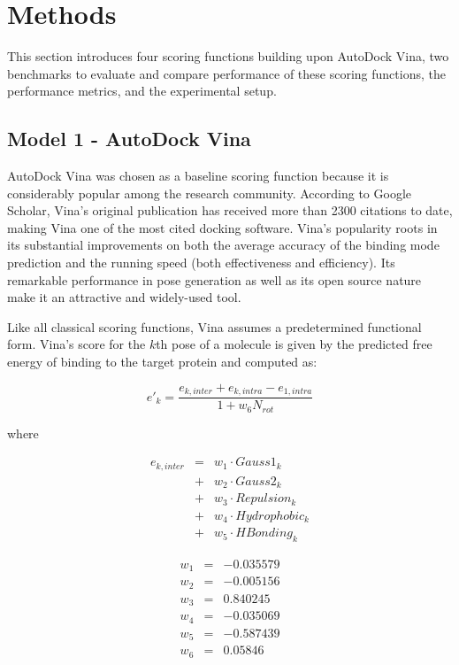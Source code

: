 \documentclass[twocolumn]{bmcart}
\begin{document}
\section*{Methods}

This section introduces four scoring functions building upon AutoDock Vina, two benchmarks to evaluate and compare performance of these scoring functions, the performance metrics, and the experimental setup.

\subsection*{Model 1 - AutoDock Vina}

AutoDock Vina \cite{595} was chosen as a baseline scoring function because it is considerably popular among the research community. According to Google Scholar, Vina's original publication \cite{595} has received more than 2300 citations to date, making Vina one of the most cited docking software. Vina's popularity roots in its substantial improvements on both the average accuracy of the binding mode prediction and the running speed (both effectiveness and efficiency). Its remarkable performance in pose generation as well as its open source nature make it an attractive and widely-used tool.

Like all classical scoring functions, Vina assumes a predetermined functional form. Vina's score for the $k$th pose of a molecule is given by the predicted free energy of binding to the target protein and computed as:

\begin{equation}
\label{rescoring2:e_k}
e'_k=\frac{e_{k,inter}+e_{k,intra}-e_{1,intra}}{1+w_6N_{rot}}
\end{equation}

where

\begin{eqnarray}
\label{rescoring2:e_k_inter}
e_{k,inter} &=& w_1 \cdot Gauss1_k \nonumber \\
            &+& w_2 \cdot Gauss2_k \nonumber \\
		    &+& w_3 \cdot Repulsion_k \nonumber \\
		    &+& w_4 \cdot Hydrophobic_k \nonumber \\
		    &+& w_5 \cdot HBonding_k
\end{eqnarray}

\begin{eqnarray}
\label{rescoring2:w}
w_1 &=& -0.035579 \nonumber \\
w_2 &=& -0.005156 \nonumber \\
w_3 &=&  0.840245 \nonumber \\
w_4 &=& -0.035069 \nonumber \\
w_5 &=& -0.587439 \nonumber \\
w_6 &=&  0.05846
\end{eqnarray}
\end{document}

